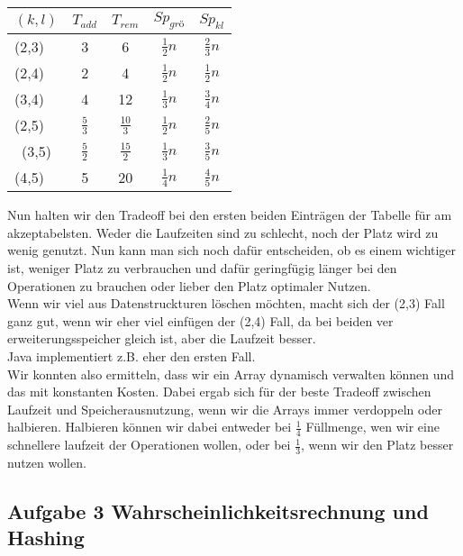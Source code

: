 \documentclass[11pt,a4paper,ngerman]{article}
\begin{document}
\begin{enumerate}[\bfseries a)]
\begin{center}
\begin{tabular}{l|cccc}
$(k,l)$& $T_{add}$ &$ T_{rem}$ &$ Sp_{grö}$ & $Sp_{kl}$\\
\hline
(2,3) & 3 & 6 & $\frac{1}{2}n$ & $\frac{2}{3} n$\\
(2,4) & 2 & 4 & $\frac{1}{2}n$ & $\frac{1}{2}n$\\
(3,4) & 4 & 12 & $\frac{1}{3}n$ & $\frac{3}{4}n$\\
(2,5) & $\frac{5}{3}$ & $\frac{10}{3}$ & $\frac{1}{2}n$ & $\frac{2}{5}n$\\\
(3,5) & $\frac{5}{2}$ & $\frac{15}{2}$ & $\frac{1}{3}n$ & $\frac{3}{5}n$\\
(4,5) & 5 & 20 & $\frac{1}{4}n$ & $\frac{4}{5}n$\\
\end{tabular}
\end{center}

Nun halten wir den Tradeoff bei den ersten beiden Einträgen der Tabelle für am akzeptabelsten. Weder die Laufzeiten sind zu schlecht, noch der Platz wird zu wenig genutzt. Nun kann man sich noch dafür entscheiden, ob es einem wichtiger ist, weniger Platz zu verbrauchen und dafür geringfügig länger bei den Operationen zu brauchen oder lieber den Platz optimaler Nutzen.\\

Wenn wir viel aus Datenstruckturen löschen möchten, macht sich der (2,3) Fall ganz gut, wenn wir eher viel einfügen der (2,4) Fall, da bei beiden ver erweiterungsspeicher gleich ist, aber die Laufzeit besser.\\
Java implementiert z.B. eher den ersten Fall.\\

Wir konnten also ermitteln, dass wir ein Array dynamisch verwalten können und das mit konstanten Kosten. Dabei ergab sich für der beste Tradeoff zwischen Laufzeit und Speicherausnutzung, wenn wir die Arrays immer verdoppeln oder halbieren. Halbieren können wir dabei entweder bei $\frac{1}{4}$ Füllmenge, wen wir eine schnellere laufzeit der Operationen wollen, oder bei $\frac{1}{3}$, wenn wir den Platz besser nutzen wollen.

\end{enumerate}

\subsection*{Aufgabe 3 \mdseries Wahrscheinlichkeitsrechnung und Hashing}
\end{document}
